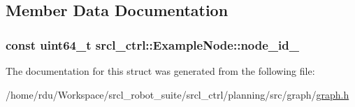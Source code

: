 \subsection{Member Data Documentation}
\hypertarget{structsrcl__ctrl_1_1ExampleNode_a2488c44c57c50555eeb95b212a15c772}{
\subsubsection[{node\-\_\-id\-\_\-}]{\setlength{\rightskip}{0pt plus 5cm}const uint64\-\_\-t srcl\-\_\-ctrl\-::\-Example\-Node\-::node\-\_\-id\-\_\-}}\label{structsrcl__ctrl_1_1ExampleNode_a2488c44c57c50555eeb95b212a15c772}


The documentation for this struct was generated from the following file\-:\begin{DoxyCompactItemize}
\item 
/home/rdu/\-Workspace/srcl\-\_\-robot\-\_\-suite/srcl\-\_\-ctrl/planning/src/graph/\hyperlink{graph_8h}{graph.\-h}\end{DoxyCompactItemize}
